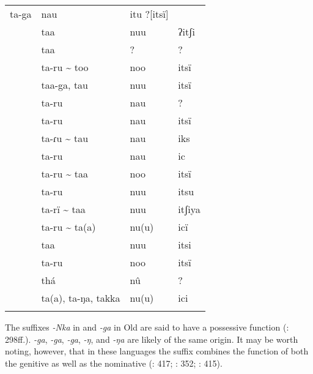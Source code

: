 \begin{table}[t]
\begin{tabularx}{\textwidth}{lQll}
ta-ga  & nau  & itu ?[itsï] \\
 & taa & nuu & ʔitʃi\\
 & taa & ? & ?\\
 & ta-ru {\textasciitilde} too & noo & itsï\\
 & taa-ga, tau & nuu & itsï\\
 & ta-ru & nau & ?\\
 & ta-ru & nau & itsï\\
 & ta-ɾu {\textasciitilde} tau & nau & iks\\
 & ta-ru & nau & ic\\
 & ta-ru {\textasciitilde} taa & noo & itsï\\
 & ta-ru & nuu & itsu\\
 & ta-rï {\textasciitilde} taa & nuu & itʃiya\\
 & ta-ru {\textasciitilde} ta(a) & nu(u) & icï\\
 & taa & nuu & itsi\\
 & ta-ru & noo & itsï\\
 & thá & nû & ?\\
 & ta(a), ta-ŋa, takka & nu(u) & ici\\
\lspbottomrule
\end{tabularx}
\end{table}

\addtocounter{footnote}{-2}

The suffixes \textit{-Nka} in  and \textit{-ga} in Old  are said to have a possessive function (\citealt{Vovin2005}: 298ff.).  \textit{-ga},  \textit{-ga},  \textit{-ga},  \textit{-ŋ}, and  \textit{-ŋa} are likely of the same origin. It may be worth noting, however, that in these languages the suffix combines the function of both the genitive as well as the nominative (\citealt{Izuyama2012}: 417; \citealt{vanderLubbeTokunaga2015}: 352; \citealt{Aoi2015}: 415).

